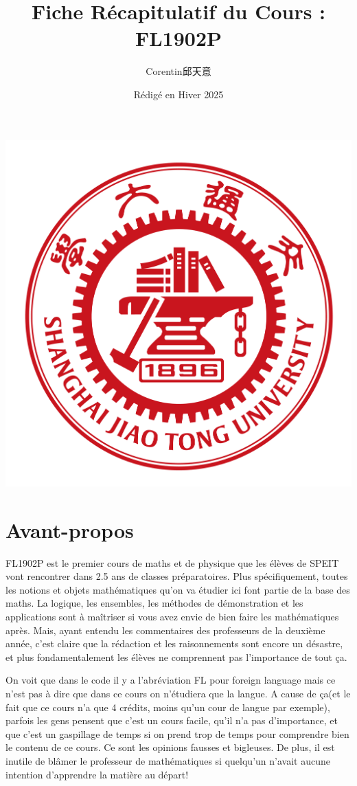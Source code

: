 \documentclass{article}
\title{\textbf{Fiche Récapitulatif du Cours :\\ FL1902P}}
\author{Corentin邱天意}
\date{Rédigé en Hiver 2025}
\begin{document}
\maketitle

\centerline{\includegraphics[scale=0.4]{sjtu}}

\newpage

\section*{Avant-propos}

FL1902P est le premier cours de maths et de physique que les élèves de SPEIT vont rencontrer dans 2.5 ans de classes préparatoires. Plus spécifiquement, toutes les notions et objets mathématiques qu'on va étudier ici font partie de la base des maths. La logique, les ensembles, les méthodes de démonstration et les applications sont à maîtriser si vous avez envie de bien faire les mathématiques après. Mais, ayant entendu les commentaires des professeurs de la deuxième année, c'est claire que la rédaction et les raisonnements sont encore un désastre, et plus fondamentalement les élèves ne comprennent pas l'importance de tout \c ca.

On voit que dans le code il y a l'abréviation FL pour foreign language mais ce n'est pas à dire que dans ce cours on n'étudiera que la langue. A cause de \c ca(et le fait que ce cours n'a que 4 crédits, moins qu'un cour de langue par exemple), parfois les gens pensent que c'est un cours facile, qu'il n'a pas d'importance, et que c'est un gaspillage de temps si on prend trop de temps pour comprendre bien le contenu de ce cours. Ce sont les opinions fausses et bigleuses. De plus, il est inutile de blâmer le professeur de mathématiques si quelqu'un n'avait aucune intention d'apprendre la matière au départ! 
\end{document}
